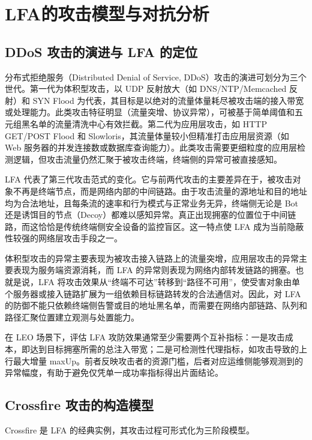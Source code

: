 \section{LFA的攻击模型与对抗分析}

\subsection{DDoS 攻击的演进与 LFA 的定位}

分布式拒绝服务（Distributed Denial of Service, DDoS）攻击的演进可划分为三个世代。第一代为体积型攻击，以 UDP 反射放大（如 DNS/NTP/Memcached 反射）和 SYN Flood 为代表，其目标是以绝对的流量体量耗尽被攻击端的接入带宽或处理能力。此类攻击特征明显（流量突增、协议异常），可被基于简单阈值和五元组黑名单的流量清洗中心有效拦截。第二代为应用层攻击，如 HTTP GET/POST Flood 和 Slowloris，其流量体量较小但精准打击应用层资源（如 Web 服务器的并发连接数或数据库查询能力）。此类攻击需要更细粒度的应用层检测逻辑，但攻击流量仍然汇聚于被攻击终端，终端侧的异常可被直接感知。

LFA 代表了第三代攻击范式的变化。它与前两代攻击的主要差异在于，被攻击对象不再是终端节点，而是网络内部的中间链路。由于攻击流量的源地址和目的地址均为合法地址，且每条流的速率和行为模式与正常业务无异，终端侧无论是 Bot 还是诱饵目的节点（Decoy）都难以感知异常。真正出现拥塞的位置位于中间链路，而这恰恰是传统终端侧安全设备的监控盲区。这一特点使 LFA 成为当前隐蔽性较强的网络层攻击手段之一。

体积型攻击的异常主要表现为被攻击接入链路上的流量突增，应用层攻击的异常主要表现为服务端资源消耗，而 LFA 的异常则表现为网络内部转发链路的拥塞。也就是说，LFA 将攻击效果从“终端不可达”转移到“路径不可用”，使受害对象由单个服务器或接入链路扩展为一组依赖目标链路转发的合法通信对。因此，对 LFA 的防御不能只依赖终端侧告警或目的地址黑名单，而需要在网络内部链路、队列和路径汇聚位置建立观测与处置能力。

在 LEO 场景下，评估 LFA 攻防效果通常至少需要两个互补指标：一是攻击成本，即达到目标拥塞所需的总注入带宽；二是可检测性代理指标，如攻击导致的上行最大增量 maxUp。前者反映攻击者的资源门槛，后者对应运维侧能够观测到的异常幅度，有助于避免仅凭单一成功率指标得出片面结论。

\subsection{Crossfire 攻击的构造模型}

Crossfire 是 LFA 的经典实例，其攻击过程可形式化为三阶段模型。

